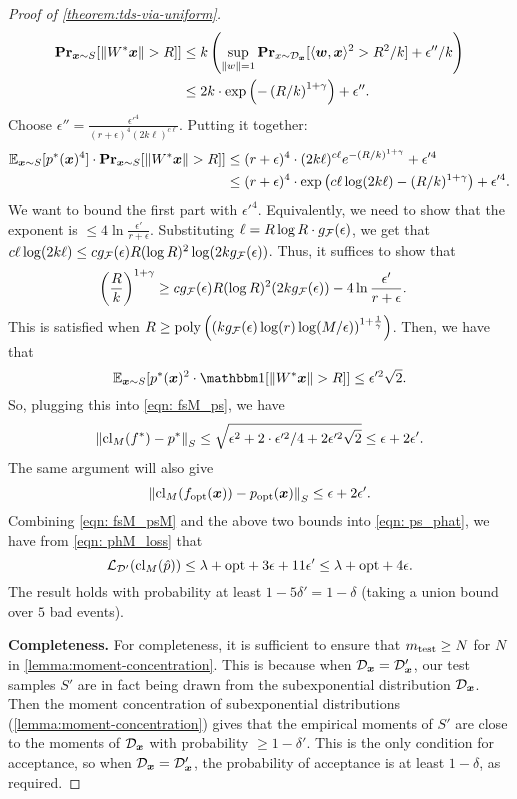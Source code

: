 \documentclass[11pt]{article} %
\numberwithin{equation}{section}
\begin{document}
\begin{proof}[Proof of \cref{theorem:tds-via-uniform}]
    \begin{align*}
        \mathbf{Pr}_{{\bm{x}} \sim S}[\left\| W^*{\bm{x}} \right\| >R]] &\le k \left( \sup_{\left\| w \right\| = 1} \mathbf{Pr}_{x \sim {\mathcal{D}}_{{\bm{x}}}}[\langle {\bm{w}}, {\bm{x}}\rangle^2 > R^2/k] + \epsilon''/k \right) \\
        &\le 2k \cdot \exp\left( -\left( R/k \right)^{1+\gamma} \right) + \epsilon''.
    \end{align*}
    Choose $\epsilon'' = \frac{\epsilon'^4}{(r + \epsilon)^4 (2k\ell)^{c\ell}}$. Putting it together:
    \begin{align*}
        \mathbb{E}_{{\bm{x}} \sim S}[p^*({\bm{x}})^4] \cdot \mathbf{Pr}_{{\bm{x}} \sim S}[\left\| W^*{\bm{x}} \right\| >R]] &\le (r + \epsilon)^4 \cdot (2k\ell)^{c\ell} e^{-(R/k)^{1+\gamma}} + \epsilon'^4 \\
        &\le (r + \epsilon)^4 \cdot \exp \left( c\ell \log(2k\ell) - (R/k)^{1+\gamma} \right) + \epsilon'^4.
    \end{align*}
    We want to bound the first part with $\epsilon'^4$. Equivalently, we need to show that the exponent is $\le 4 \ln \frac{\epsilon'}{r + \epsilon}$. Substituting $\ell = R\log R \cdot g_{\mathcal{F}}(\epsilon)$, we get that $c\ell \log (2k \ell) \le c g_{\mathcal{F}}(\epsilon) R (\log R)^2 \log(2k g_{\mathcal{F}}(\epsilon))$. Thus, it suffices to show that
    \begin{align*}
        \left( \frac{R}{k} \right)^{1+\gamma} &\ge cg_{\mathcal{F}}(\epsilon)R(\log R)^2 (2k g_{\mathcal{F}}(\epsilon)) - 4\ln {\frac{\epsilon'}{r + \epsilon}}.
    \end{align*}
    This is satisfied when $R \ge \mathrm{poly}\left(\left(k g_{\mathcal{F}}(\epsilon)\log(r)\log(M/\epsilon)\right)^{1+\frac{1}{\gamma}}\right)$. Then, we have that 
    \[
    \E_{\x \sim S}[p^*(\x)^2 \cdot \ind[\Norm{W^*\x} >R]] \le \epsilon'^2 \sqrt{2}.
    \]
    So, plugging this into \cref{eqn: fsM_ps}, we have
    \[
        \left\| \mathrm{cl}_M(f^{*}) - p^* \right\|_S \le \sqrt{\epsilon^2 + 2 \cdot \epsilon'^2/4 + 2\epsilon'^2 \sqrt{2}} \le \epsilon + 2\epsilon'.
    \]
    The same argument will also give
    \[
        \left\| \mathrm{cl}_M(f_{\mathrm{opt}}({\bm{x}})) - p_{\mathrm{opt}}({\bm{x}}) \right\|_S \le \epsilon + 2\epsilon'.
    \]
    Combining \cref{eqn: fsM_psM} and the above two bounds into \cref{eqn: ps_phat}, we have from \cref{eqn: phM_loss} that
    \[
    {\mathcal{L}}_{{\mathcal{D}}'} (\mathrm{cl}_M(\hat p))\le \lambda + \mathrm{opt} + 3\epsilon + 11\epsilon' \le \lambda + \mathrm{opt} + 4\epsilon.
    \]
    The result holds with probability at least $1 - 5\delta' = 1 - \delta$ (taking a union bound over $5$ bad events).

    \textbf{Completeness.} For completeness, it is sufficient to ensure that $m_{\mathrm{test}} \ge N$ for $N$ in \cref{lemma:moment-concentration}. This is because when ${\mathcal{D}}_{{\bm{x}}} = {\mathcal{D}}_{{\bm{x}}}'$, our test samples $S'$ are in fact being drawn from the subexponential distribution ${\mathcal{D}}_{{\bm{x}}}$. Then the moment concentration of subexponential distributions (\cref{lemma:moment-concentration}) gives that the empirical moments of $S'$ are close to the moments of ${\mathcal{D}}_{{\bm{x}}}$ with probability $\ge 1 - \delta'$. This is the only condition for acceptance, so when ${\mathcal{D}}_{{\bm{x}}} = {\mathcal{D}}_{{\bm{x}}}'$, the probability of acceptance is at least $1 - \delta$, as required.


\end{proof}
\end{document}

